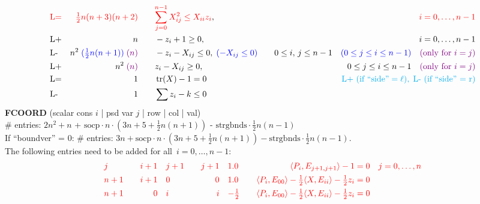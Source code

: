\documentclass[11pt,a4paper]{article}
\DeclareMathOperator{\tr}{tr}
\theoremstyle{definition}
\begin{document}
{\[\begin{aligned}
    &{\color{red}\text{L=}} & {\color{red}\tfrac{1}{2}n(n+3)(n+2)} \qquad 
    &{\color{red} \sum_{j=0}^{n-1} X_{ij}^2 \leq X_{ii}z_i}, \quad &
    {\color{red} i = 0,\dots, n-1} \\
    &\text{L+} &n \qquad & -z_i + 1 \geq 0, \quad & i = 0,\dots,n-1 \\
    &\text{L-} &n^2\; {\color{blue}(\tfrac{1}{2}n(n+1))}\; {\color{violet}(n)} \qquad & -z_i - X_{ij} \leq 0,\;
    {\color{blue} (-X_{ij} \leq 0)}\quad & 0 \leq i,\, j \leq n-1\quad {\color{blue}(0
    \leq j \leq i \leq n-1)}\quad {\color{violet} (\text{only for } i=j)} \\
    &\text{L+} &n^2\; {\color{violet}(n)} \qquad & z_i - X_{ij} \geq 0,\quad & 0
    \leq j \leq i \leq n-1 \quad {\color{violet} (\text{only for } i=j)} \\
    &\text{L=}  &1 \qquad & \tr(X) - 1 = 0 \quad & \qquad
    {\color{cyan} \text{L+ (if ``side''} = \ell),\; \text{L- (if ``side'' = r})} \\
    &\text{L-}  &1 \qquad & \sum z_i - k \leq 0
  \end{aligned}
\]
\textbf{FCOORD} (scalar cons $i$ | psd var $j$ | row | col | val) \\
\# entries: $2n^2+n$ + {\color{red} $\text{socp} \cdot
  n\cdot(3n+5+\tfrac{1}{2}n(n+1))$ } - {\color{blue} $\text{strgbnds} \cdot
  \tfrac{1}{2}n(n-1)$}\\
{\color{violet} If ``boundver'' = 0: \# entries: $3n + \text{socp} \cdot
  n\cdot(3n+5+\tfrac{1}{2}n(n+1)) - \text{strgbnds} \cdot
  \tfrac{1}{2}n(n-1)$.}\\
{\color{red} The following entries need to be added for all~$i = 0,\dots,n-1$}:
\[
  \begin{aligned}
    &{\color{red}j} \quad &{\color{red}i+1} \quad & {\color{red}j+1} \quad
    & {\color{red}j+1} \quad & {\color{red}1.0} \quad & {\color{red}
      \langle P_i,
      E_{j+1,j+1} \rangle - 1 = 0} \quad & {\color{red} j = 0,\dots,n} \\
    &{\color{red}n+1} \quad &{\color{red}i+1} \quad & {\color{red}0} \quad
    & {\color{red}0} \quad & {\color{red}1.0} \quad & {\color{red} \langle
      P_i, E_{00} \rangle - \tfrac{1}{2}\langle X,E_{ii}\rangle -
      \tfrac{1}{2}z_i = 0} \quad & \\
    &{\color{red}n+1} \quad &{\color{red}0} \quad & {\color{red}i} \quad
    & {\color{red}i} \quad & {\color{red}-\tfrac{1}{2}} \quad & {\color{red} \langle
      P_i, E_{00} \rangle - \tfrac{1}{2}\langle X,E_{ii}\rangle -
      \tfrac{1}{2}z_i = 0} \quad & \\

\end{aligned}\]}
\end{document}
